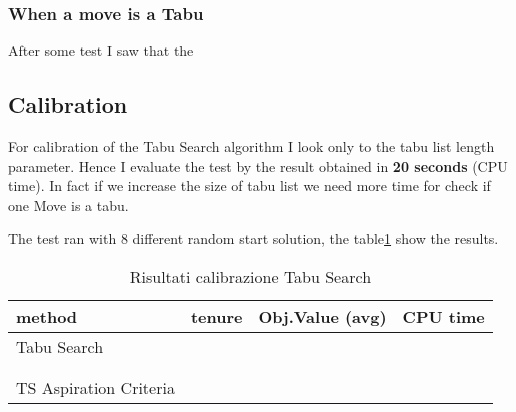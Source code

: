 	\subsubsection{When a move is a Tabu}
		After some test I saw that the 

	
\subsection{Calibration}
	For calibration of the Tabu Search algorithm I look only to the tabu list length parameter. Hence I evaluate the test by the result obtained in \textbf{20 seconds} (CPU time). In fact if we increase the size of tabu list we need more time for check if one Move is a tabu.
	
	The test ran with 8 different random start solution, the table\ref{tab:TS-calibration} show the results.
	
	
	\begin{table}
		\centering
		\begin{tabular} {l l l l}
			\toprule
			method & tenure & Obj.Value (avg) & CPU time \\
			\midrule
			Tabu Search & & & \\
			 			& & & \\
			 			& & & \\
			\midrule
			TS Aspiration Criteria & & & \\
		\end{tabular}
		\caption{\label{tab:TS-calibration}Risultati calibrazione Tabu Search}
	\end{table}
	
	



	